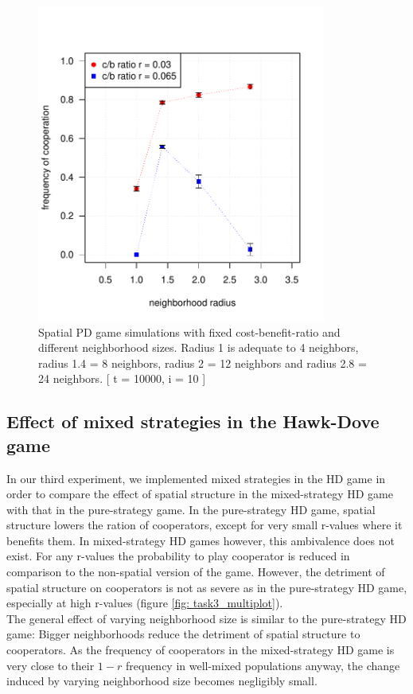 \begin{figure}[H]
	\centering 
	\includegraphics[width=9.5cm]{task2_radiusplot}
	\caption{Spatial PD game simulations with fixed cost-benefit-ratio and different neighborhood sizes. Radius 1 is adequate to 4 neighbors, radius 1.4 = 8 neighbors, radius 2 = 12 neighbors and radius 2.8 = 24 neighbors. [ t = 10000, i = 10 ] }\label{fig: task2_radiusplot}
\end{figure}




\subsection{Effect of mixed strategies in the Hawk-Dove game}
In our third experiment, we implemented mixed strategies in the HD game in order to compare the effect of spatial structure in the mixed-strategy HD game with that in the pure-strategy game. In the pure-strategy HD game, spatial structure lowers the ration of cooperators, except for very small r-values where it benefits them. In mixed-strategy HD games however, this ambivalence does not exist. For any r-values the probability to play cooperator is reduced in comparison to the non-spatial version of the game. However, the detriment of spatial structure on cooperators is not as severe as in the pure-strategy HD game, especially at high r-values (figure \ref*{fig: task3_multiplot}).\\ 
The general effect of varying neighborhood size is similar to the pure-strategy HD game: Bigger neighborhoods reduce the detriment of spatial structure to cooperators. As the frequency of cooperators in the mixed-strategy HD game is very close to their $1-r$ frequency in well-mixed populations anyway, the change induced by varying neighborhood size becomes negligibly small.



